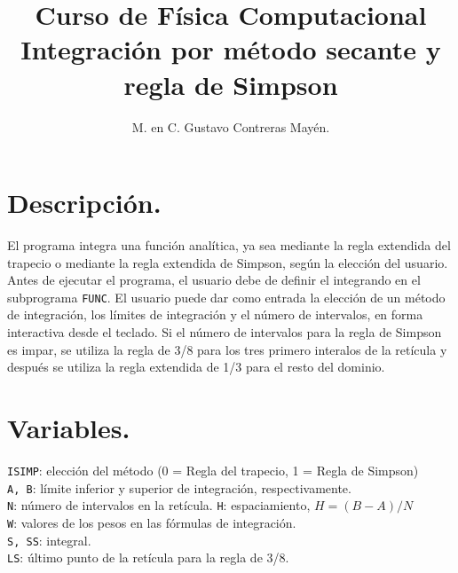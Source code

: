 \documentclass[12pt]{article}
\author{M. en C. Gustavo Contreras Mayén.}
\title{Curso de Física Computacional \\ Integración por método secante y regla de Simpson}
\date{ }
\begin{document}
\maketitle
\fontsize{14}{14}\selectfont
\section{Descripción.}
El programa integra una función analítica, ya sea mediante la regla extendida del trapecio o mediante la regla extendida de Simpson, según la elección del usuario.
\\
Antes de ejecutar el programa, el usuario debe de definir el integrando en el subprograma \texttt{FUNC}. El usuario puede dar como entrada la elección de un método de integración, los límites de integración y el número de intervalos, en forma interactiva desde el teclado. Si el número de intervalos para la regla de Simpson es impar, se utiliza la regla de 3/8 para los tres primero interalos de la retícula y después se utiliza la regla extendida de 1/3 para el resto del dominio.
\section{Variables.}
\texttt{ISIMP}: elección del método (0 = Regla del trapecio, 1 = Regla de Simpson) \\
\texttt{A, B}: límite inferior y superior de integración, respectivamente. \\
\texttt{N}: número de intervalos en la retícula.
\texttt{H}: espaciamiento, $H=(B-A)/N$ \\
\texttt{W}: valores de los pesos en las fórmulas de integración.\\
\texttt{S, SS}: integral.\\
\texttt{LS}: último punto de la retícula para la regla de 3/8.
\end{document}
